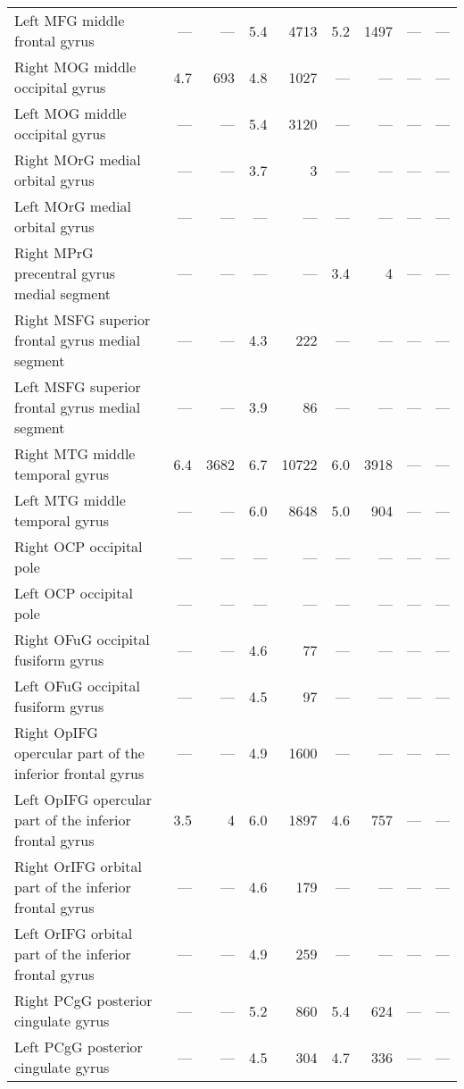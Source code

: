 \documentclass[]{article}
\begin{document}
\begin{table}[ht]
{\begin{tabular}{lrrrrrrrr}
  Left MFG   middle frontal gyrus & --- & --- & 5.4 & 4713 & 5.2 & 1497 & --- & --- \\ 
  Right MOG   middle occipital gyrus & 4.7 & 693 & 4.8 & 1027 & --- & --- & --- & --- \\ 
  Left MOG   middle occipital gyrus & --- & --- & 5.4 & 3120 & --- & --- & --- & --- \\ 
  Right MOrG  medial orbital gyrus & --- & --- & 3.7 & 3 & --- & --- & --- & --- \\ 
  Left MOrG  medial orbital gyrus & --- & --- & --- & --- & --- & --- & --- & --- \\ 
  Right MPrG  precentral gyrus medial segment & --- & --- & --- & --- & 3.4 & 4 & --- & --- \\ 
  Right MSFG  superior frontal gyrus medial segment & --- & --- & 4.3 & 222 & --- & --- & --- & --- \\ 
  Left MSFG  superior frontal gyrus medial segment & --- & --- & 3.9 & 86 & --- & --- & --- & --- \\ 
  Right MTG   middle temporal gyrus & 6.4 & 3682 & 6.7 & 10722 & 6.0 & 3918 & --- & --- \\ 
  Left MTG   middle temporal gyrus & --- & --- & 6.0 & 8648 & 5.0 & 904 & --- & --- \\ 
  Right OCP   occipital pole & --- & --- & --- & --- & --- & --- & --- & --- \\ 
  Left OCP   occipital pole & --- & --- & --- & --- & --- & --- & --- & --- \\ 
  Right OFuG  occipital fusiform gyrus & --- & --- & 4.6 & 77 & --- & --- & --- & --- \\ 
  Left OFuG  occipital fusiform gyrus & --- & --- & 4.5 & 97 & --- & --- & --- & --- \\ 
  Right OpIFG opercular part of the inferior frontal gyrus & --- & --- & 4.9 & 1600 & --- & --- & --- & --- \\ 
  Left OpIFG opercular part of the inferior frontal gyrus & 3.5 & 4 & 6.0 & 1897 & 4.6 & 757 & --- & --- \\ 
  Right OrIFG orbital part of the inferior frontal gyrus & --- & --- & 4.6 & 179 & --- & --- & --- & --- \\ 
  Left OrIFG orbital part of the inferior frontal gyrus & --- & --- & 4.9 & 259 & --- & --- & --- & --- \\ 
  Right PCgG  posterior cingulate gyrus & --- & --- & 5.2 & 860 & 5.4 & 624 & --- & --- \\ 
  Left PCgG  posterior cingulate gyrus & --- & --- & 4.5 & 304 & 4.7 & 336 & --- & --- \\ 

\end{tabular}}
\end{table}
\end{document}
